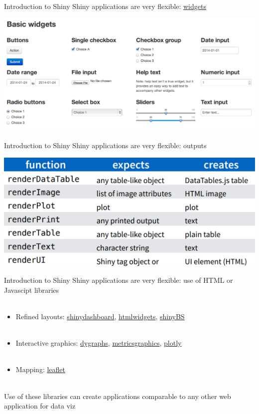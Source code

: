 \documentclass[serif]{beamer}\usepackage[]{graphicx}\usepackage[]{color}
\begin{document}
\begin{frame}[t]{Introduction to Shiny}
Shiny applications are very flexible: \href{http://shiny.rstudio.com/gallery/widget-gallery.html}{widgets}
\begin{center}
\includegraphics[width = \textwidth]{fig/widgets.png}
\end{center}
\end{frame}

\begin{frame}[t]{Introduction to Shiny}
Shiny applications are very flexible: outputs
\begin{center}
\includegraphics[width = \textwidth]{fig/outputs.png}
\end{center}
\end{frame}

\begin{frame}[t]{Introduction to Shiny}
Shiny applications are very flexible: use of HTML or Javascipt libraries \\~\\
\begin{itemize}
\item Refined layouts: \href{https://rstudio.github.io/shinydashboard/}{shinydashboard}, \href{http://www.htmlwidgets.org/}{htmlwidgets}, \href{https://ebailey78.github.io/shinyBS/}{shinyBS} \\~\\
\item Interactive graphics: \href{https://rstudio.github.io/dygraphs/}{dygraphs}, \href{http://hrbrmstr.github.io/metricsgraphics/}{metricsgraphics}, \href{https://plot.ly/r/shiny-tutorial/}{plotly} \\~\\
\item Mapping: \href{https://rstudio.github.io/leaflet/}{leaflet} \\~\\
\end{itemize}
Use of these libraries can create applications comparable to any other web application for data viz
\end{frame}
\end{document}
